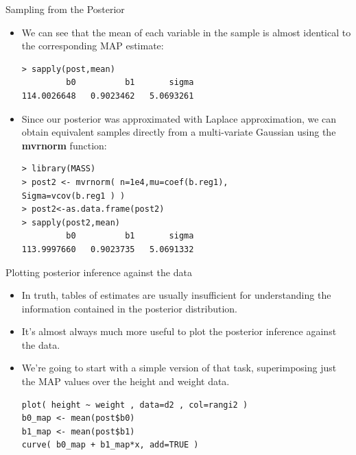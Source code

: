 \documentclass[handout]{beamer}
\begin{document}
\begin{frame}[fragile]{Sampling from the Posterior}
\scriptsize{
\begin{itemize}
\item We can see that the mean of each variable in the sample is almost identical to the corresponding MAP estimate:

\begin{verbatim}
> sapply(post,mean)
         b0          b1       sigma 
114.0026648   0.9023462   5.0693261  
\end{verbatim}



\item Since our posterior was approximated with Laplace approximation, we can obtain equivalent samples directly from a multi-variate Gaussian using the \textbf{mvrnorm} function:


\begin{verbatim}
> library(MASS)
> post2 <- mvrnorm( n=1e4,mu=coef(b.reg1), 
Sigma=vcov(b.reg1 ) )
> post2<-as.data.frame(post2)
> sapply(post2,mean)
         b0          b1       sigma 
113.9997660   0.9023735   5.0691332 
\end{verbatim}




\end{itemize}
 

 
}
\end{frame}



\begin{frame}[fragile]{Plotting posterior inference against the data}
\scriptsize{
\begin{itemize}
\item In truth, tables of estimates are usually insufficient for understanding the information contained in the posterior distribution.

\item It's almost always much more useful to plot the posterior inference against the data.

\item We’re going to start with a simple version of that task, superimposing just the MAP values over the height and weight data.

\begin{verbatim}
plot( height ~ weight , data=d2 , col=rangi2 )
b0_map <- mean(post$b0)
b1_map <- mean(post$b1)
curve( b0_map + b1_map*x, add=TRUE ) 
\end{verbatim}



\end{itemize}
 

 
}
\end{frame}
\end{document}
